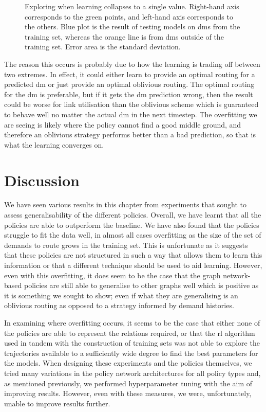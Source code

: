 \begin{figure}
    \centering
    
    \caption{Exploring when learning collapses to a single value. Right-hand axis corresponds to the green points, and left-hand axis corresponds to the others. Blue plot is the result of testing models on \acp{dm} from the training set, whereas the orange line is from \acp{dm} outside of the training set. Error area is the standard deviation.}
    \label{fig:exp_fail}
\end{figure}

The reason this occurs is probably due to how the learning is trading off between two extremes. In effect, it could either learn to provide an optimal routing for a predicted \ac{dm} or just provide an optimal oblivious routing. The optimal routing for the \ac{dm} is preferable, but if it gets the \ac{dm} prediction wrong, then the result could be worse for link utilisation than the oblivious scheme which is guaranteed to behave well no matter the actual \ac{dm} in the next timestep. The overfitting we are seeing is likely where the policy cannot find a good middle ground, and therefore an oblivious strategy performs better than a bad prediction, so that is what the learning converges on.


\section{Discussion}
We have seen various results in this chapter from experiments that sought to assess generalisability of the different policies. Overall, we have learnt that all the policies are able to outperform the baseline. We have also found that the policies struggle to fit the data well, in almost all cases overfitting as the size of the set of demands to route grows in the training set. This is unfortunate as it suggests that these policies are not structured in such a way that allows them to learn this information or that a different technique should be used to aid learning. However, even with this overfitting, it does seem to be the case that the graph network-based policies are still able to generalise to other graphs well which is positive as it is something we sought to show; even if what they are generalising is an oblivious routing as opposed to a strategy informed by demand histories.

In examining where overfitting occurs, it seems to be the case that either none of the policies are able to represent the relations required, or that the \ac{rl} algorithm used in tandem with the construction of training sets was not able to explore the trajectories available to a sufficiently wide degree to find the best parameters for the models. When designing these experiments and the policies themselves, we tried many variations in the policy network architectures for all policy types and, as mentioned previously, we performed hyperparameter tuning with the aim of improving results. However, even with these measures, we were, unfortunately, unable to improve results further.

